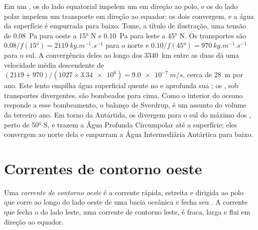 Em um , os  do lado equatorial impelem um 
em direção ao polo, e os  do lado polar impelem um transporte em direção
ao equador: os dois convergem, e a água da superfície é empurrada para baixo. Tome,
a título de ilustração, uma tensão de \qty{0.08}{Pa} para oeste a \ang{15} N e
\qty{0.10}{Pa} para leste a \ang{45} N. Os transportes são
$0.08/f(\ang{15}) = \qty{2119}{kg.m^{-1}.s^{-1}}$ para o norte e $0.10/f(\ang{45}) =
\qty{970}{kg.m^{-1}.s^{-1}}$ para o sul. A convergência deles ao longo dos \qty{3340}{km}
entre as duas  dá uma velocidade média descendente de
$(2119 + 970)/(1027 \times \num{3.34e6}) = \qty{9.0e-7}{m/s}$, cerca de \qty{28}{m}
por ano. Este lento  empilha água superficial quente no  e aprofunda sua
; os , sob transportes divergentes, são bombeados para cima. Como
o interior do oceano responde a esse bombeamento, o balanço de Sverdrup, é um assunto
do volume do terceiro ano. Em torno da Antártida, os  divergem para o sul
do máximo dos , perto de \ang{50} S, e trazem a Água Profunda Circumpolar
até a superfície; eles convergem ao norte dela e empurram a Água Intermediária Antártica
para baixo.

\section{Correntes de contorno oeste}\label{sec:b1:ocean-circulation:wbc}

\begin{definition}\label{def:b1:ocean-circulation:wbc}
Uma \emph{corrente de contorno oeste} é a corrente rápida,
estreita e dirigida ao polo que corre ao longo do lado oeste de uma bacia oceânica e
fecha seu . A corrente que fecha o  do lado leste,
uma corrente de contorno leste, é fraca, larga e flui em direção ao equador.
\end{definition}

